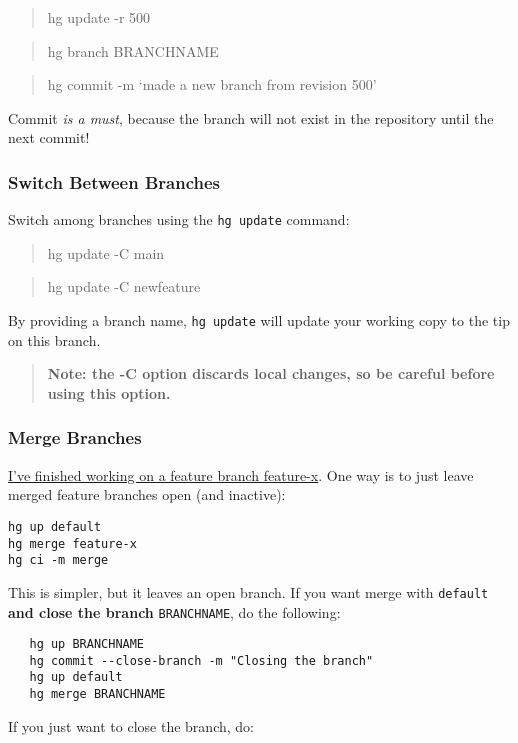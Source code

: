 \begin{quote}
hg update -r 500

\end{quote}
\begin{quote}
hg branch BRANCHNAME

\end{quote}
\begin{quote}
hg commit -m `made a new branch from revision 500'

\end{quote}
Commit \emph{is a must}, because the branch will not exist in the
repository until the next commit!

\subsubsection{Switch Between Branches}

Switch among branches using the \verb!hg update! command:

\begin{quote}
hg update -C main

\end{quote}
\begin{quote}
hg update -C newfeature

\end{quote}
By providing a branch name, \verb!hg update! will update your
working copy to the tip on this branch.

\begin{quote}
\textbf{Note: the -C option discards local changes, so be careful before using this option.}

\end{quote}
\subsubsection{Merge Branches}

\href{http://stackoverflow.com/questions/3227988/closing-hg-branches}{I've finished working on a feature branch feature-x}.
One way is to just leave merged feature branches open (and
inactive):

\begin{verbatim}
hg up default
hg merge feature-x
hg ci -m merge
\end{verbatim}
This is simpler, but it leaves an open branch. If you want merge
with \verb!default! \textbf{and close the branch}
\verb!BRANCHNAME!, do the following:

\begin{verbatim}
   hg up BRANCHNAME
   hg commit --close-branch -m "Closing the branch"
   hg up default
   hg merge BRANCHNAME
\end{verbatim}
If you just want to close the branch, do:

